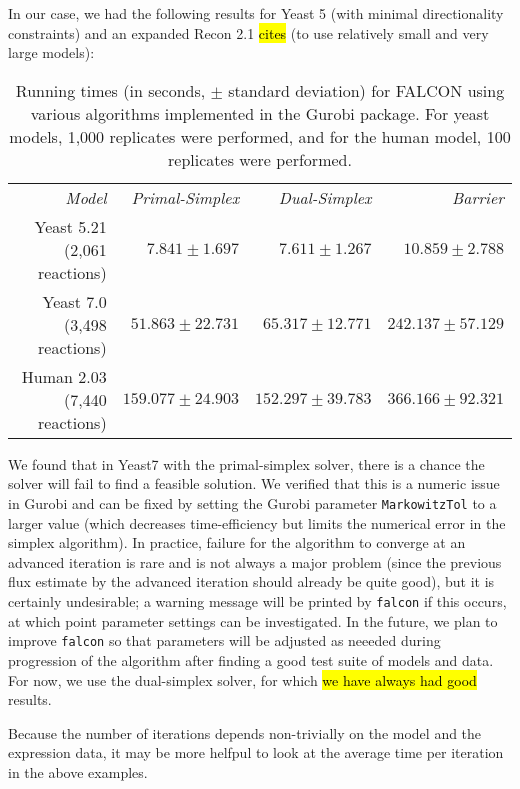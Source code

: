 In our case, we had the following results for Yeast 5 (with minimal
directionality constraints) and an expanded
Recon 2.1 \hl{cites} (to use relatively small and very large models):

\begin{table}
\begin{center}
\begin{tabular}{rrrr}
\emph{Model}                 & \emph{Primal-Simplex} & \emph{Dual-Simplex} & \emph{Barrier} \\
Yeast 5.21 (2,061 reactions) & $ 7.841 \pm 1.697    $ & $ 7.611 \pm 1.267    $ & $ 10.859 \pm 2.788   $\\ 
Yeast 7.0 (3,498 reactions)  & $ 51.863 \pm 22.731  $ & $ 65.317 \pm 12.771  $ & $ 242.137 \pm 57.129 $\\
Human 2.03 (7,440 reactions) & $ 159.077 \pm 24.903 $ & $ 152.297 \pm 39.783 $ & $ 366.166 \pm 92.321 $\\
\end{tabular}
\end{center}
\caption{Running times (in seconds, $\pm$ standard deviation) for
  FALCON using various algorithms implemented in the Gurobi package.
  For yeast models, 1,000 replicates were performed, and for the human
  model, 100 replicates were performed.}
\label{tab:methodTime}
\end{table}

We found that in Yeast7 with the primal-simplex solver, there is a
chance the solver will fail to find a feasible solution.
We verified that this is a numeric issue
in Gurobi and can be fixed by setting the Gurobi parameter
\texttt{MarkowitzTol} to a larger value (which decreases
time-efficiency but limits the numerical error in the
simplex algorithm). In practice, failure for the algorithm to converge
at an advanced iteration is rare and is not always a major problem (since the previous
flux estimate by the advanced iteration should already be quite good), but it
is certainly undesirable; a warning message will be printed by
\texttt{falcon} if this occurs, at which point parameter settings can
be investigated. In the future, we plan to improve \texttt{falcon} so
that parameters will be adjusted as neeeded during progression of the
algorithm after finding a good test suite of models and data. For now,
we use the dual-simplex solver, for which \hl{we have always had good}
results.

Because the number of iterations depends non-trivially on the model
and the expression data, it may be more helfpul to look at the 
average time per iteration in the above examples.

